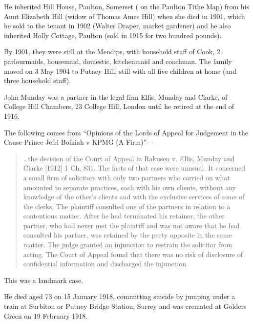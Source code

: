 He inherited Hill House, Paulton, Somerset ( on the Paulton Tithe Map) from his Aunt Elizabeth Hill (widow of Thomas Ames Hill) when she died in 1901, which he sold to the tenant in 1902 (Walter Draper, market gardener) and he also inherited Holly Cottage, Paulton (sold in 1915 for two hundred pounds).

By 1901, they were still at the Mendips, with household staff of Cook, 2 parlourmaids, housemaid, domestic, kitchenmaid and coachman. The family moved on 3 May 1904 to Putney Hill, still with all five children at home (and three household staff).\cite{JohnHillMunday1911}

John Munday was a partner in the legal firm Ellis, Munday and Clarke, of College Hill Chambers, 23 College Hill, London\cite{HeaddingtonMannor} until he retired at the end of 1916.

The following comes from ``Opinions of the Lords of Appeal for Judgement in the Cause Prince Jefri Bolkiah v KPMG (A Firm)''\cite{JohnHillMundayJudgement}---

\begin{quotation}
\dots the decision of the Court of Appeal in Rakusen v. Ellis, Munday and Clarke [1912] 1 Ch. 831. The facts of that case were unusual. It concerned a small firm of solicitors with only two partners who carried on what amounted to separate practices, each with his own clients, without any knowledge of the other's clients and with the exclusive services of some of the clerks. The plaintiff consulted one of the partners in relation to a contentious matter. After he had terminated his retainer, the other partner, who had never met the plaintiff and was not aware that he had consulted his partner, was retained by the party opposite in the same matter. The judge granted an injunction to restrain the solicitor from acting. The Court of Appeal found that there was no risk of disclosure of confidential information and discharged the injunction. 
\end{quotation}

This was a landmark case.\cite{JohnHillMundayJudgement}

He died aged 73 on 15 January 1918,\cite{JHMdeath} committing suicide by jumping under a train at Surbiton or Putney Bridge Station, Surrey \cite{JohnHillMundaySuicide} and was cremated at Golders Green on 19 February 1918.

